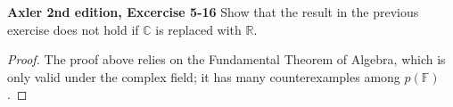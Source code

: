 \documentclass{article}
\newcommand{\R}{\mathbb{R}}
\newcommand{\F}{\mathbb{F}}
\begin{document}


\textbf{Axler 2nd edition, Excercise 5-16}
Show that the result in the previous exercise does not hold if $\mathbb{C}$ is replaced with $\R$.

\begin{proof}
    The proof above relies on the Fundamental Theorem of Algebra, which is only valid under the complex field; it has many counterexamples among $p(\F)$.
\end{proof}

\end{document}
